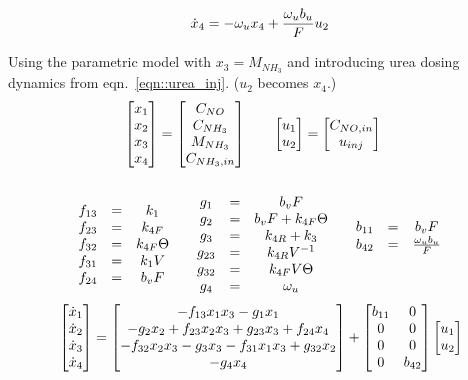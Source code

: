 \begin{equation}{\label{eqn::urea_inj}}
    \dot x_4 = - \omega_u x_4 +   \frac{\omega_u b_u}{F} u_{2}
\end{equation}

Using the parametric model with $x_3 = M_{NH_3}$ and introducing urea dosing
dynamics from eqn.~\ref{eqn::urea_inj}. ($u_2$ becomes $x_4$.)
\begin{align*}
    \begin{bmatrix} x_1 \\ x_2 \\ x_3 \\ x_4 \end{bmatrix} = \begin{bmatrix} C_{NO} \\ C_{NH_3} \\ M_{NH_3} \\ C_{NH_3, in} \end{bmatrix} \qquad &
    \begin{bmatrix} u_1 \\ u_2  \end{bmatrix} = \begin{bmatrix} C_{NO, in} \\ u_{inj} \end{bmatrix}
\end{align*}
\begin{align*}
    \begin{matrix} 
    \\f_{13} &=& k_1
    \\f_{23} &=& k_{4F}
    \\f_{32} &=& k_{4F} \Theta
    \\f_{31} &=& k_1 V
    \\f_{24} &=& b_v F
     \end{matrix}
    \qquad
    \begin{matrix} 
    \\ g_1    &=& b_v F
    \\ g_2    &=& b_v F + k_{4F} \Theta
    \\ g_{3}  &=& k_{4R}+k_3
    \\ g_{23} &=& k_{4R} V^{-1}
    \\ g_{32} &=& k_{4F} V \Theta
    \\ g_4 &=& \omega_u
     \end{matrix}
    \qquad
    \begin{matrix} 
        b_{11} &=& b_v F
        \\
        b_{42} &=& \frac{\omega_u b_u}{F}
     \end{matrix}
\end{align*}
\begin{equation}{\label{eqn::full_nonlinear}}
     \begin{bmatrix} \dot x_1 \\
        \dot x_2\\
        \dot x_3\\
        \dot x_4 \end{bmatrix} =
    \begin{bmatrix} 
        -f_{13} x_1 x_3
        -g_1 x_1
        \\
        -g_2 x_2
        + f_{23} x_2 x_3
        + g_{23} x_3
        + f_{24} x_4
        \\
        -f_{32} x_2 x_3
        -g_3 x_3
        -f_{31} x_1 x_3
        + g_{32} x_2
        \\
        -g_4 x_4
     \end{bmatrix}
    + \begin{bmatrix} b_{11} & 0\\
          0     & 0\\
          0     & 0\\
          0     & b_{42}   \end{bmatrix}\begin{bmatrix} u_1 \\ u_2  \end{bmatrix}
\end{equation}

